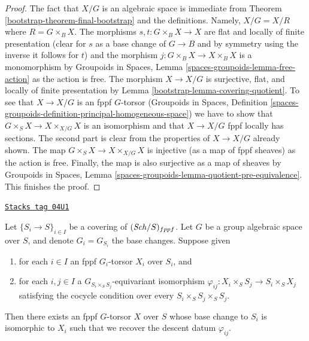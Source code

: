 \begin{proof}

The fact that $X/G$ is an algebraic space is immediate from
Theorem \ref{bootstrap-theorem-final-bootstrap}
and the definitions. Namely, $X/G = X/R$ where $R = G \times_B X$.
The morphisms $s, t : G \times_B X \to X$ are flat and locally of
finite presentation (clear for $s$ as a base change of $G \to B$ and
by symmetry using the inverse it follows for $t$) and the morphism
$j : G \times_B X \to X \times_B X$ is a monomorphism by
Groupoids in Spaces, Lemma \ref{spaces-groupoids-lemma-free-action}
as the action is free. The morphism $X \to X/G$ is surjective, flat, and
locally of finite presentation by Lemma \ref{bootstrap-lemma-covering-quotient}.
To see that $X \to X/G$ is an fppf $G$-torsor
(Groupoids in Spaces, Definition
\ref{spaces-groupoids-definition-principal-homogeneous-space})
we have to show that $G \times_S X \to X \times_{X/G} X$
is an isomorphism and that $X \to X/G$ fppf locally has sections.
The second part is clear from the properties of $X \to X/G$ already shown.
The map $G \times_S X \to X \times_{X/G} X$ is injective (as a map of
fppf sheaves) as the action is free. Finally, the map is also surjective
as a map of sheaves by Groupoids in Spaces, Lemma
\ref{spaces-groupoids-lemma-quotient-pre-equivalence}.
This finishes the proof.
\end{proof}

\begin{lemma}
\label{bootstrap-lemma-descent-torsor}
\href{https://stacks.math.columbia.edu/tag/04U1}{\texttt{Stacks tag 04U1}}

Let $\{S_i \to S\}_{i \in I}$ be a covering of $(\mathit{Sch}/S)_{fppf}$.
Let $G$ be a group algebraic space over $S$, and denote
$G_i = G_{S_i}$ the base changes. Suppose given
\begin{enumerate}
\item for each $i \in I$ an fppf $G_i$-torsor $X_i$ over $S_i$,
and
\item for each $i, j \in I$ a $G_{S_i \times_S S_j}$-equivariant isomorphism
$\varphi_{ij} : X_i \times_S S_j \to S_i \times_S X_j$ satisfying the cocycle
condition over every $S_i \times_S S_j \times_S S_j$.
\end{enumerate}
Then there exists an fppf $G$-torsor $X$ over $S$
whose base change to $S_i$ is isomorphic to $X_i$ such that we
recover the descent datum $\varphi_{ij}$.
\end{lemma}

